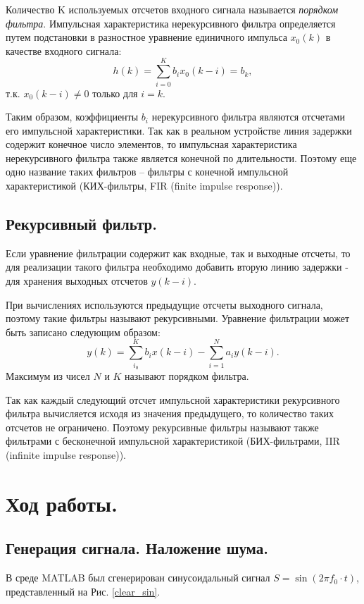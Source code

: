 \documentclass[a4paper,14pt]{extarticle}
\begin{document}
Количество K используемых отсчетов входного сигнала называется \textit{порядком фильтра}. Импульсная характеристика нерекурсивного фильтра определяется путем подстановки в разностное уравнение единичного импульса $x_0 (k)$ в качестве входного сигнала:
\begin{equation*}
h(k) = \sum_{i=0}^K b_i x_0(k-i) = b_k,
\end{equation*}
т.к. $x_0(k-i) \neq 0$ только для $i = k$.

Таким образом, коэффициенты $b_i$ нерекурсивного фильтра являются
отсчетами его импульсной характеристики. Так как в реальном устройстве
линия задержки содержит конечное число элементов, то импульсная характеристика нерекурсивного фильтра также является конечной по длительности.
Поэтому еще одно название таких фильтров -- фильтры с конечной импульсной характеристикой (КИХ-фильтры, FIR (finite impulse response)).

\subsection{Рекурсивный фильтр.}
Если уравнение фильтрации содержит как входные, так и выходные
отсчеты, то для реализации такого фильтра необходимо добавить вторую
линию задержки - для хранения выходных отсчетов $y(k - i)$.

При вычислениях используются предыдущие отсчеты выходного сигнала, поэтому такие фильтры называют рекурсивными. Уравнение фильтрации может быть записано следующим образом:
\begin{equation*}
y(k) = \sum_{i_0}^K b_i x(k-i) - \sum_{i=1}^N a_i y(k-i).
\end{equation*}
Максимум из чисел $N$ и $K$ называют порядком фильтра.

Так как каждый следующий отсчет импульсной характеристики рекурсивного фильтра вычисляется исходя из значения предыдущего, то количество таких отсчетов не ограничено. Поэтому рекурсивные фильтры называют также фильтрами с бесконечной импульсной характеристикой (БИХ-фильтрами, IIR (infinite impulse response)).

\section{Ход работы.}
\subsection{Генерация сигнала. Наложение шума.}
В среде MATLAB был сгенерирован синусоидальный сигнал $S = \sin(2 \pi f_0 \cdot t)$, представленный на Рис. \ref{clear_sin}.
\end{document}
